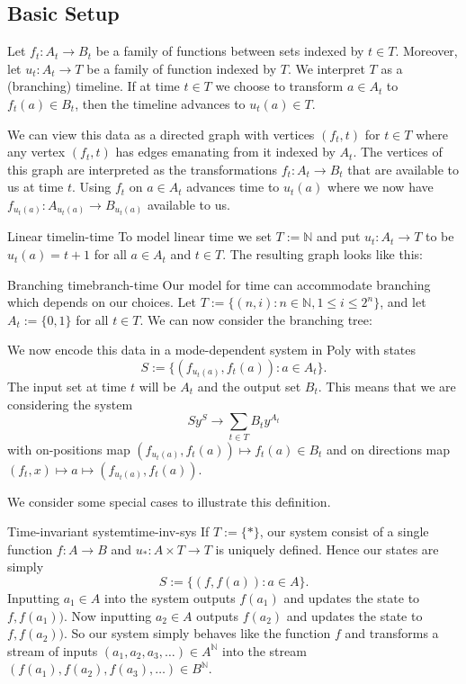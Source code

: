 \documentclass[12pt, a4paper]{article}
\theoremstyle{definition}
\theoremstyle{plain}
\theoremstyle{plain}
\theoremstyle{plain}
\theoremstyle{plain}
\theoremstyle{plain}
\theoremstyle{remark}
\theoremstyle{remark}
\begin{document}
\subsection{Basic Setup}
Let $f_t: A_t \rightarrow B_t$ be a family of functions between sets indexed by $t \in T$. Moreover, let $u_t: A_t \rightarrow T$ be a family of function indexed by $T$. We interpret $T$ as a (branching) timeline. If at time $t \in T$ we choose to transform $a \in A_t$ to $f_t(a) \in B_t$, then the timeline advances to $u_t(a) \in T$. 

We can view this data as a directed graph with vertices $(f_t, t)$ for $t \in T$ where any vertex $(f_t,t)$ has edges emanating from it indexed by $A_t$. The vertices of this graph are interpreted as the transformations $f_t: A_t \rightarrow B_t$ that are available to us at time $t$. Using $f_t$ on $a \in A_t$ advances time to $u_t(a)$ where we now have $f_{u_t(a)}: A_{u_t(a)} \rightarrow B_{u_t(a)}$ available to us.

\begin{tcexample}{Linear time}{lin-time}
    To model linear time we set $T := \mathbb{N}$ and put $u_t : A_t \rightarrow T$ to be $u_t(a) = t+1$ for all $a \in A_t$ and $t \in T$. The resulting graph looks like this:


\end{tcexample}

\begin{tcexample}{Branching time}{branch-time}
    Our model for time can accommodate branching which depends on our choices. Let $T := \{(n,i) : n \in \mathbb{N}, 1 \leq i \leq 2^n \}$, and let $A_t := \{0,1\}$ for all $t \in T$. We can now consider the branching tree:

\end{tcexample}

We now encode this data in a mode-dependent system in \textsf{Poly} with states
$$ S := \{ (f_{u_t(a)}, f_t(a)) : a \in A_t \}.$$
The input set at time $t$ will be $A_t$ and the output set $B_t$. This means that we are considering the system
$$ S y^S \rightarrow \sum_{t \in T} B_t y^{A_t}$$
with on-positions map $(f_{u_t(a)}, f_t(a)) \mapsto f_t(a) \in B_t$ and on directions map $(f_t, x) \mapsto a \mapsto (f_{u_t(a)}, f_t(a))$.

We consider some special cases to illustrate this definition.
\begin{tcexample}{Time-invariant system}{time-inv-sys}
    If $T := \{* \}$, our system consist of a single function $f : A \rightarrow B$ and $u_*: A \times T \rightarrow T$ is uniquely defined. Hence our states are simply $$ S := \{ (f, f(a)) : a \in A\}.$$
    Inputting $a_1 \in A$ into the system outputs $f(a_1)$ and updates the state to $f, f(a_1))$. Now inputting $a_2 \in A$ outputs $f(a_2)$ and updates the state to $f, f(a_2))$. So our system simply behaves like the function $f$ and transforms a stream of inputs $(a_1, a_2, a_3, \ldots) \in A^{\mathbb{N}}$ into the stream $(f(a_1), f(a_2), f(a_3), \ldots)\in B^{\mathbb{N}}$.
\end{tcexample}
\end{document}
